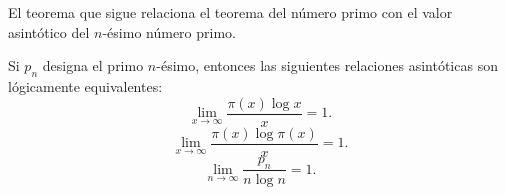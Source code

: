\documentclass[12pt,a4paper]{book}
\begin{document}
    El teorema que sigue relaciona el teorema del número primo con el valor
    asintótico del $n$-ésimo número primo.

    \begin{teorema}
        Si $p_n$ designa el primo $n$-ésimo, entonces las siguientes relaciones
        asintóticas son lógicamente equivalentes:
        \begin{equation}
            \lim_{x\to\infty}\frac{\pi(x)\log x}{x}=1.
        \end{equation}
        \begin{equation}
            \lim_{x\to\infty}\frac{\pi(x)\log\pi(x)}{x}=1.
        \end{equation}
        \begin{equation}
            \lim_{n\to\infty}\frac{p_n}{n\log n}=1.
        \end{equation}
    \end{teorema}
\end{document}
